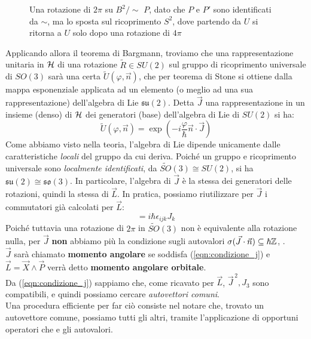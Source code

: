 \documentclass[../../FisicaTeorica.tex]{subfiles}
\begin{document}
\begin{figure}[H]
\caption{Una rotazione di $2\pi$ su $B^2/\sim$  $P$, dato che $P$ e $P'$ sono identificati da $\sim$, ma lo sposta sul ricoprimento $S^2$, dove partendo da $U$ si ritorna a $U$ solo dopo una rotazione di $4\pi$}
\end{figure}

Applicando allora il teorema di Bargmann, troviamo che una rappresentazione unitaria in $\mathcal{H}$ di una rotazione $\tilde{R} \in SU(2)$ sul gruppo di ricoprimento universale di $SO(3)$ sarà una certa $\tilde{U}(\varphi,\vec{n})$, che per teorema di Stone si ottiene dalla mappa esponenziale applicata ad un elemento (o meglio ad una sua rappresentazione) dell'algebra di Lie $\mathfrak{su}(2)$. Detta $\vec{J}$ una rappresentazione in un insieme (denso) di $\mathcal{H}$ dei generatori (base) dell'algebra di Lie di $SU(2)$ si ha:
\[
\tilde{U}(\varphi,\vec{n}) = \exp\left(-i\frac{\varphi}{\hbar}\vec{n}\cdot \vec{J}\right)
\]
Come abbiamo visto nella teoria, l'algebra di Lie dipende unicamente dalle caratteristiche \textit{locali} del gruppo da cui deriva. Poiché un gruppo e ricoprimento universale sono \textit{localmente identificati}, da $\tilde{SO}(3) \cong SU(2)$, si ha $\mathfrak{su}(2) \cong \mathfrak{so}(3)$. In particolare, l'algebra di $\vec{J}$ è la stessa dei generatori delle rotazioni, quindi la stessa di $\vec{L}$. In pratica, possiamo riutilizzare per $\vec{J}$ i commutatori già calcolati per $\vec{L}$:
\begin{equation}
[J_i, J_j] = i\hbar \epsilon_{ijk}J_k
\label{eqn:condizione_j}
\end{equation}
Poiché tuttavia una rotazione di $2\pi$ in $\tilde{SO}(3)$ non è equivalente alla rotazione nulla, per $\vec{J}$ \textbf{non} abbiamo più la condizione sugli autovalori  $\sigma(\vec{J}\cdot \vec{n}) \subseteq \hbar \mathbb{Z}$, .\\
$\vec{J}$ sarà chiamato \textbf{momento angolare} se soddisfa (\ref{eqn:condizione_j}) e $\vec{L}=\vec{X}\land \vec{P}$ verrà detto \textbf{momento angolare orbitale}.\\

Da (\ref{eqn:condizione_j}) sappiamo che, come ricavato per $\vec{L}$, $\vec{J}^{\,2}, J_3$ sono compatibili, e quindi possiamo cercare \textit{autovettori comuni}.\\
Una procedura efficiente per far ciò consiste nel notare che, trovato un autovettore comune, possiamo  tutti gli altri, tramite l'applicazione di opportuni operatori che  e  gli autovalori.\\
\end{document}
